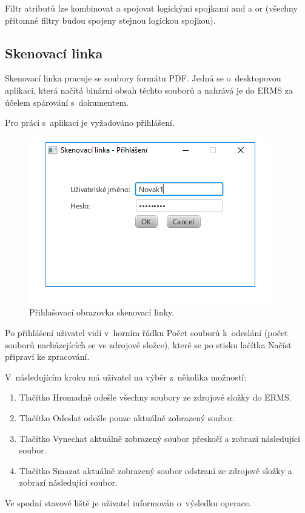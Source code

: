 \documentclass[
  master,
  field=ainfp,
  biblatex,
  language=czech,
  glossaries,
  theorems=false,
  index
]{kidiplom}
\begin{document}
Filtr atributů lze kombinovat a spojovat logickými spojkami and a or (všechny přítomné filtry budou spojeny stejnou logickou spojkou).

\subsection{Skenovací linka}
Skenovací linka pracuje se soubory formátu PDF. Jedná se o~desktopovou aplikaci, která načítá binární obsah těchto souborů a nahrává je do ERMS za účelem spárování s~dokumentem.

Pro práci s~aplikací je vyžadováno přihlášení.
\begin{figure}[h]
  \centerline{\includegraphics[width=0.5\linewidth]{./images/ScanLinePrihlaseni.png}} 
  \caption{Přihlašovací obrazovka skenovací linky.} 
\end{figure}

Po přihlášení uživatel vidí v~horním řádku Počet souborů k~odeslání (počet souborů nacházejících se ve zdrojové složce), které se po stisku lačítka Načíst připraví ke zpracování.

V~následujícím kroku má uživatel na výběr z~několika možností:
\begin{enumerate}
	\item Tlačítko Hromadně odešle všechny soubory ze zdrojové složky do ERMS.
	\item Tlačítko Odeslat odešle pouze aktuálně zobrazený soubor.
	\item Tlačítko Vynechat aktuálně zobrazený soubor přeskočí a zobrazí následující soubor.
	\item Tlačítko Smazat aktuálně zobrazený soubor odstraní ze zdrojové složky a zobrazí následující soubor.
\end{enumerate}

Ve spodní stavové liště je uživatel informován o~výsledku operace.
\end{document}
